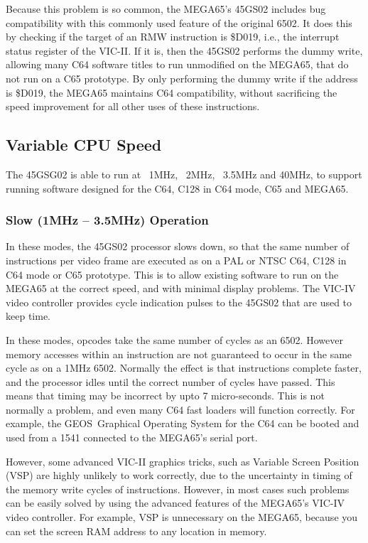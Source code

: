Because this problem is so common, the MEGA65's 45GS02 includes bug
compatibility with this
commonly used feature of the original 6502.  It does this by checking
if the target of an RMW
instruction is \$D019, i.e., the interrupt status register of the VIC-II.
If it is, then
the 45GS02 performs the dummy write, allowing many C64 software titles
to run unmodified on the
MEGA65, that do not run on a C65 prototype.  By only performing the
dummy write if the address
is \$D019, the MEGA65 maintains C64 compatibility, without sacrificing
the speed improvement
for all other uses of these instructions.

\subsection{Variable CPU Speed}

The 45GSG02 is able to run at ~1MHz, ~2MHz, ~3.5MHz and 40MHz,
to support running software
designed for the C64, C128 in C64 mode, C65 and MEGA65.

\subsubsection{Slow (1MHz -- 3.5MHz) Operation}
In these modes, the 45GS02 processor slows down, so that the same number of instructions
per video frame are executed as on a PAL or NTSC C64, C128 in C64 mode or C65 prototype.
This is to allow existing software to run on the MEGA65 at the correct speed, and with
minimal display problems.  The VIC-IV video controller provides cycle indication pulses
to the 45GS02 that are used to keep time.

In these modes, opcodes take the same number of cycles as an 6502.
However memory accesses within an
instruction are not guaranteed to occur in the same cycle as on a 1MHz 6502.  Normally
the effect is that instructions complete faster, and the processor idles until the
correct number of cycles have passed. This means that timing may be incorrect by upto
7 micro-seconds.  This is not normally a problem, and even many C64 fast loaders will
function correctly. For example, the GEOS\texttrademark \ Graphical Operating System for the C64
can be booted and used from a 1541 connected to the MEGA65's serial port.

However, some advanced VIC-II graphics tricks, such as Variable Screen
Position (VSP) are
highly unlikely to work correctly, due to the uncertainty in timing of the memory write
cycles of instructions.  However, in most cases such problems can be
easily solved by using
the advanced features of the MEGA65's VIC-IV video controller.
For example, VSP is unnecessary
on the MEGA65, because you can set the screen RAM address to any location in memory.


